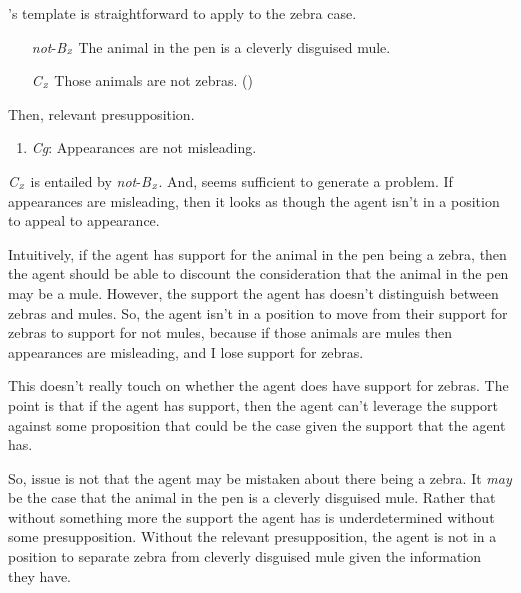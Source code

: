 \documentclass[10pt]{article}
\newcommand{\tri}[2]{\emph{#2}\(_{\text{\tiny\emph #1}}\)}
\begin{document}
\begin{note}
  \citeauthor{Wright:2011wn}'s template is straightforward to apply to the zebra case.
  \begin{enumerate}
  \item[\emph{not}-\tri{Z}{B}] The animal in the pen is a cleverly disguised mule.
  \item[\tri{Z}{C}] Those animals are not zebras. (\citeyear[90]{Wright:2011wn})
  \end{enumerate}

  Then, relevant presupposition.
  \begin{enumerate}
  \item \emph{Cg}: Appearances are not misleading.
  \end{enumerate}

  \tri{Z}{C} is entailed by \emph{not}-\tri{Z}{B}.
  And, seems sufficient to generate a problem.
  If appearances are misleading, then it looks as though the agent isn't in a position to appeal to appearance.

  Intuitively, if the agent has support for the animal in the pen being a zebra, then the agent should be able to discount the consideration that the animal in the pen may be a mule.
  However, the support the agent has doesn't distinguish between zebras and mules.
  So, the agent isn't in a position to move from their support for zebras to support for not mules, because if those animals are mules then appearances are misleading, and I lose support for zebras.

  This doesn't really touch on whether the agent does have support for zebras.
  The point is that if the agent has support, then the agent can't leverage the support against some proposition that could be the case given the support that the agent has.

  So, issue is not that the agent may be mistaken about there being a zebra.
  It \emph{may} be the case that the animal in the pen is a cleverly disguised mule.
  Rather that without something more the support the agent has is underdetermined without some presupposition.
  Without the relevant presupposition, the agent is not in a position to separate zebra from cleverly disguised mule given the information they have.
\end{note}
\end{document}
